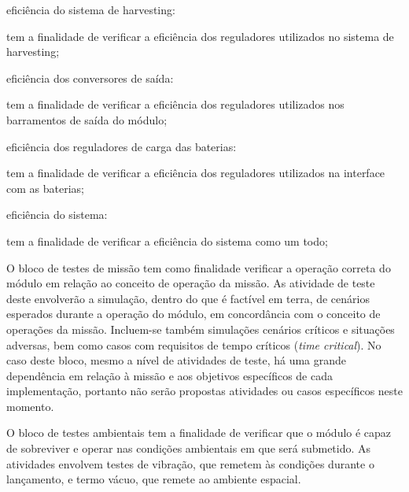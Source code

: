 \begin{alineas}
    \item eficiência do sistema de harvesting:
    \begin{alineas}
        \item tem a finalidade de verificar a eficiência dos reguladores utilizados no sistema de harvesting;
    \end{alineas}

    \item eficiência dos conversores de saída:
    \begin{alineas}
        \item tem a finalidade de verificar a eficiência dos reguladores utilizados nos barramentos de saída do módulo;
    \end{alineas}

    \item eficiência dos reguladores de carga das baterias:
    \begin{alineas}
        \item tem a finalidade de verificar a eficiência dos reguladores utilizados na interface com as baterias;
    \end{alineas}

    \item eficiência do sistema:
    \begin{alineas}
        \item tem a finalidade de verificar a eficiência do sistema como um todo;
    \end{alineas}

\end{alineas}


O bloco de testes de missão tem como finalidade verificar a operação correta do módulo em relação ao conceito de operação da missão.
As atividade de teste deste envolverão a simulação, dentro do que é factível em terra, de cenários esperados durante a operação do módulo, em concordância com o conceito de operações da missão.
Incluem-se também simulações cenários críticos e situações adversas, bem como casos com requisitos de tempo críticos (\textit{time critical}).
No caso deste bloco, mesmo a nível de atividades de teste, há uma grande dependência em relação à missão e aos objetivos específicos de cada implementação, portanto não serão propostas atividades ou casos específicos neste momento.

O bloco de testes ambientais tem a finalidade de verificar que o módulo é capaz de sobreviver e operar nas condições ambientais em que será submetido.
As atividades envolvem testes de vibração, que remetem às condições durante o lançamento, e termo vácuo, que remete ao ambiente espacial.



